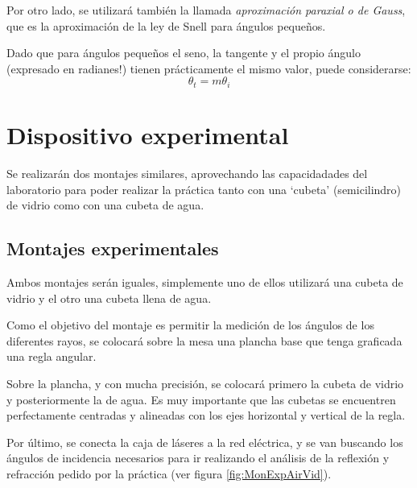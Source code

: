 \documentclass[a4paper,twocolumn]{article}
\begin{document}
        Por otro lado, se utilizará también la llamada \textit{aproximación paraxial o de Gauss}, que es la aproximación de la ley de Snell para ángulos pequeños.
        
        Dado que para ángulos pequeños el seno, la tangente y el propio ángulo (expresado en radianes!) tienen prácticamente el mismo valor, puede considerarse:        
            \begin{equation}
                \theta_t = m \theta_i
            \end{equation}



            
        
	\section{Dispositivo experimental}
	
	Se realizarán dos montajes similares, aprovechando las capacidadades del laboratorio para poder realizar la práctica tanto con una `cubeta' (semicilindro) de vidrio como con una cubeta de agua. 
        
        \subsection{Montajes experimentales}

        
        Ambos montajes serán iguales, simplemente uno de ellos utilizará una cubeta de vidrio y el otro una cubeta llena de agua.
        
        Como el objetivo del montaje es permitir la medición de los ángulos de los diferentes rayos, se colocará sobre la mesa una plancha base que tenga graficada una regla angular.
        
        Sobre la plancha, y con mucha precisión, se colocará primero la cubeta de vidrio y posteriormente la de agua. Es muy importante que las cubetas se encuentren perfectamente centradas y alineadas con los ejes horizontal y vertical de la regla.
        
        Por último, se conecta la caja de láseres a la red eléctrica, y se van buscando los ángulos de incidencia necesarios para ir realizando el análisis de la reflexión y refracción pedido por la práctica (ver figura \ref{fig:MonExpAirVid}).
        
\end{document}
